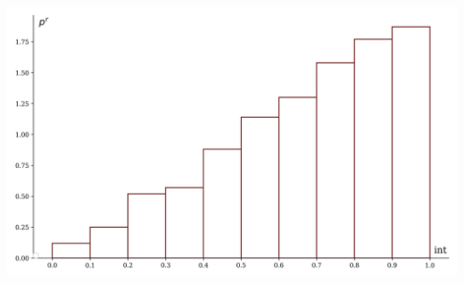 \documentclass[a4paper, 14pt]{extarticle}
\begin{document}
\begin{minipage}[t]{0.25\textwidth}
\includegraphics[width=\textwidth, height=\textheight, keepaspectratio]{sample32_hist}
\end{minipage}
\end{document}
